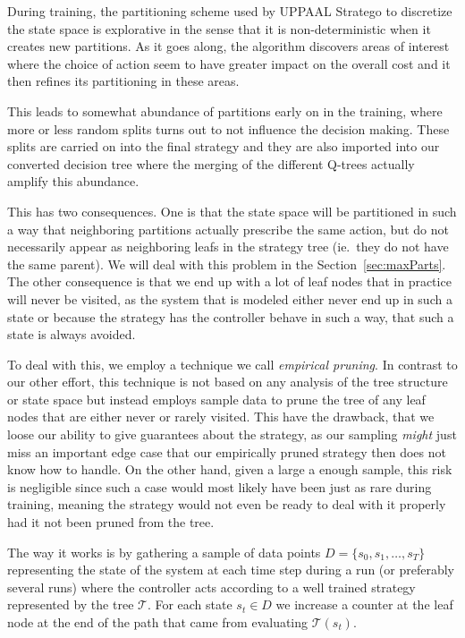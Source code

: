 During training, the partitioning scheme used by UPPAAL Stratego to discretize
the state space is explorative in the sense that it is non-deterministic when it
creates new partitions. As it goes along, the algorithm discovers areas of
interest where the choice of action seem to have greater impact on the overall
cost and it then refines its partitioning in these areas.

This leads to somewhat abundance of partitions early on in the training, where
more or less random splits turns out to not influence the decision making. These
splits are carried on into the final strategy and they are also imported into
our converted decision tree where the merging of the different Q-trees actually
amplify this abundance.

This has two consequences. One is that the state space will be partitioned in
such a way that neighboring partitions actually prescribe the same action, but
do not necessarily appear as neighboring leafs in the strategy tree (ie.\ they
do not have the same parent). We will deal with this problem in the
Section~\ref{sec:maxParts}. The other consequence is that we end up with a lot
of leaf nodes that in practice will never be visited, as the system that is
modeled either never end up in such a state or because the strategy has the
controller behave in such a way, that such a state is always avoided.

To deal with this, we employ a technique we call \textit{empirical pruning}. In
contrast to our other effort, this technique is not based on any analysis of the
tree structure or state space but instead employs sample data to prune the tree
of any leaf nodes that are either never or rarely visited. This have the
drawback, that we loose our ability to give guarantees about the strategy, as our
sampling \textit{might} just miss an important edge case that our empirically
pruned strategy then does not know how to handle. On the other hand, given a
large a enough sample, this risk is negligible since such a case would most
likely have been just as rare during training, meaning the strategy would not
even be ready to deal with it properly had it not been pruned from the tree.

The way it works is by gathering a sample of data points $D = \{ s_0, s_1,
\ldots, s_T\}$ representing the state of the system at each time step during a
run (or preferably several runs) where the controller acts according to a well
trained strategy represented by the tree $\mathcal{T}$. For each state $s_t \in
D$ we increase a counter at the leaf node at the end of the path that came from
evaluating $\mathcal{T}(s_t)$.

